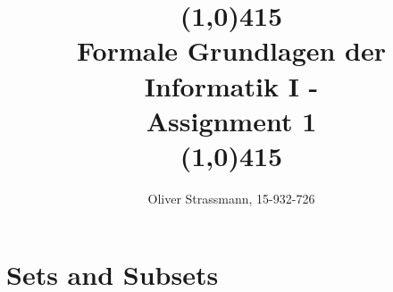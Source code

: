 \documentclass{article}
\title{ \line(1,0){415} \\ Formale Grundlagen der Informatik I -\\ Assignment 1 \theexercise\\
\line(1,0){415}}
\author{Oliver Strassmann, 15-932-726}
\begin{document}
\maketitle



\section{Sets and  Subsets}
\end{document}
